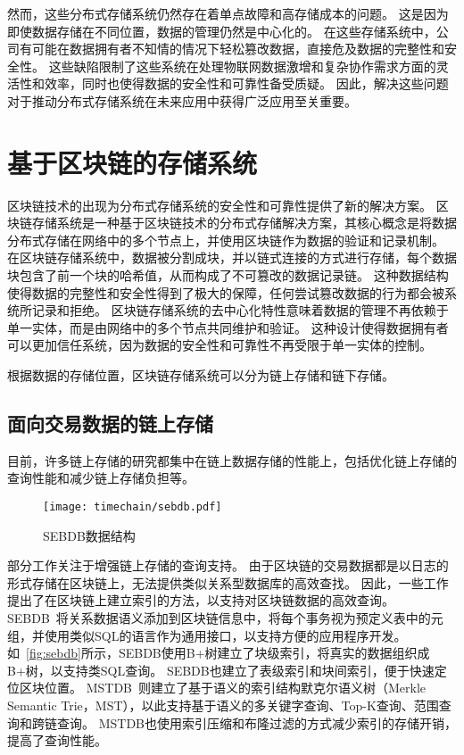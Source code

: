 然而，这些分布式存储系统仍然存在着单点故障和高存储成本的问题。
这是因为即使数据存储在不同位置，数据的管理仍然是中心化的。
在这些存储系统中，公司有可能在数据拥有者不知情的情况下轻松篡改数据，直接危及数据的完整性和安全性。
这些缺陷限制了这些系统在处理物联网数据激增和复杂协作需求方面的灵活性和效率，同时也使得数据的安全性和可靠性备受质疑。
因此，解决这些问题对于推动分布式存储系统在未来应用中获得广泛应用至关重要。

\section{基于区块链的存储系统}
区块链技术的出现为分布式存储系统的安全性和可靠性提供了新的解决方案。
区块链存储系统是一种基于区块链技术的分布式存储解决方案，其核心概念是将数据分布式存储在网络中的多个节点上，并使用区块链作为数据的验证和记录机制。
在区块链存储系统中，数据被分割成块，并以链式连接的方式进行存储，每个数据块包含了前一个块的哈希值，从而构成了不可篡改的数据记录链。
这种数据结构使得数据的完整性和安全性得到了极大的保障，任何尝试篡改数据的行为都会被系统所记录和拒绝。
区块链存储系统的去中心化特性意味着数据的管理不再依赖于单一实体，而是由网络中的多个节点共同维护和验证。
这种设计使得数据拥有者可以更加信任系统，因为数据的安全性和可靠性不再受限于单一实体的控制。

根据数据的存储位置，区块链存储系统可以分为链上存储和链下存储。

\subsection{面向交易数据的链上存储}
目前，许多链上存储的研究都集中在链上数据存储的性能上，包括优化链上存储的查询性能和减少链上存储负担等。

\begin{figure}[t]
    \centering
    \texttt{[image: timechain/sebdb.pdf]}
    \caption{SEBDB数据结构}
    \label{fig:sebdb}
\end{figure}

部分工作关注于增强链上存储的查询支持。
由于区块链的交易数据都是以日志的形式存储在区块链上，无法提供类似关系型数据库的高效查找。
因此，一些工作提出了在区块链上建立索引的方法，以支持对区块链数据的高效查询。
SEBDB~\cite{zhu2019sebdb}将关系数据语义添加到区块链信息中，将每个事务视为预定义表中的元组，并使用类似SQL的语言作为通用接口，以支持方便的应用程序开发。
如~\autoref{fig:sebdb}所示，SEBDB使用B+树建立了块级索引，将真实的数据组织成B+树，以支持类SQL查询。
SEBDB也建立了表级索引和块间索引，便于快速定位区块位置。
MSTDB~\cite{zhou2022mstdb}则建立了基于语义的索引结构默克尔语义树（Merkle Semantic Trie，MST），以此支持基于语义的多关键字查询、Top-K查询、范围查询和跨链查询。
MSTDB也使用索引压缩和布隆过滤的方式减少索引的存储开销，提高了查询性能。

